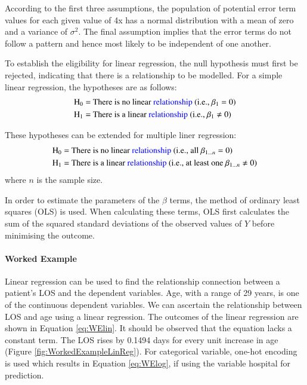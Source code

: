 \documentclass[../thesis.tex]{subfiles}
\begin{document}
According to the first three assumptions, the population of potential error term values for each given value of 4x  has a normal distribution with a mean of zero and a variance of $\sigma^{2}$. The final assumption implies that the error terms do not follow a pattern and hence most likely to be independent of one another.

To establish the eligibility for linear regression, the null hypothesis must first be rejected, indicating that there is a relationship to be modelled. For a simple linear regression, the hypotheses are as follows:
\begin{align}
    \text{H}_{0} =& \text{ There is no linear \textcolor{blue}{relationship} (i.e., $\beta_{1} = 0$)}\\
    \text{H}_{1} =&\text{ There is a linear \textcolor{blue}{relationship}  (i.e., $\beta_{1} \neq 0$)}
\end{align}

These hypotheses can be extended for multiple liner regression:
\begin{align}
    \text{H}_{0} =& \text{ There is no linear \textcolor{blue}{relationship} (i.e., all $\beta_{1...n} = 0$)}\\
    \text{H}_{1} =&\text{ There is a linear \textcolor{blue}{relationship} (i.e., at least one $\beta_{1...n} \neq 0$)}
\end{align}
where $n$ is the sample size.

In order to estimate the parameters of the $\beta$ terms, the method of ordinary least squares (OLS) is used. When calculating these terms, OLS first calculates the sum of the squared standard deviations of the observed values of $Y$ before minimising the outcome.

\paragraph{Worked Example}
Linear regression can be used to find the relationship connection between a patient's LOS and the dependent variables. Age, with a range of 29 years, is one of the continuous dependent variables. We can ascertain the relationship between LOS and age using a linear regression. The outcomes of the linear regression are shown in Equation \eqref{eq:WElin}. It should be observed that the equation lacks a constant term. The LOS rises by 0.1494 days for every unit increase in age (Figure \ref{fig:WorkedExampleLinReg}). For categorical variable, one-hot encoding is used which results in Equation \eqref{eq:WElog}, if using the variable hospital for prediction. 
\end{document}
